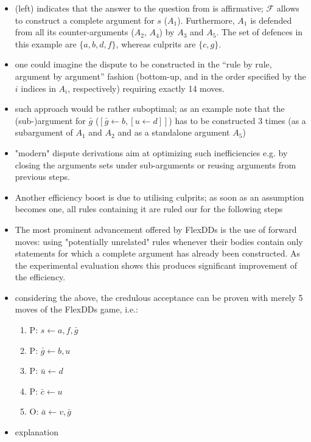 \documentclass[conference]{IEEEtran}
\newcommand{\frF}{\ensuremath{\mathcal{F}}\xspace}
\newcommand{\rulA}[2]{\ensuremath{#1 \leftarrow #2}\xspace}
\newcommand{\argu}[1]{\ensuremath{A_{#1}}}
\newcommand{\arguInline}[2]{\ensuremath{[\rulA{#1}{#2}]}}
\newcommand{\stmt}[1]{\ensuremath{#1}}
\begin{document}
\begin{itemize}
  \item {} (left) indicates that the answer to the question from  is affirmative; \frF allows to construct a complete argument for $s$ ($A_1$). Furthermore, $A_1$ is defended from all its counter-arguments ($A_2$, $A_4$) by $A_3$ and $A_5$. The set of defences in this example are $\{ a,b,d,f \}$, whereas culprits are $\{ c, g \}$. 
  \item one could imagine the dispute to be constructed in the ``rule by rule, argument by argument'' fashion (bottom-up, and in the order specified by the $i$ indices in $A_i$, respectively) requiring exactly 14 moves.
  \item such approach  would be rather suboptimal; as an example note that the (sub-)argument for \stmt{\bar{g}} (\arguInline{\bar{g}}{b, \arguInline{u}{d}}) has to be constructed 3 times (as a subargument of \argu{1} and \argu{2} and as a standalone argument \argu{5})
  \item "modern" dispute derivations aim at optimizing such inefficiencies e.g. by closing the arguments sets under sub-arguments or reusing arguments from previous steps.
  \item Another efficiency boost is due to utilising culprits; as soon as an assumption becomes one, all rules containing it are ruled our for the following steps
  \item The most prominent advancement offered by FlexDDs is the use of forward moves: using "potentially unrelated" rules whenever their bodies contain only statements for which a complete argument has already been constructed. As the experimental evaluation shows this produces significant improvement of the efficiency.  
  \item considering the above, the credulous acceptance can be proven with merely 5 moves of the FlexDDs game, i.e.:
  \begin{enumerate}
    \renewcommand{\labelenumi}{step \arabic{enumi}.}
    \item P: \rulA{s}{a,f,\bar{g}}
    \item P: \rulA{\bar{g}}{b,u}
    \item P: \rulA{\bar{u}}{d}
    \item P: \rulA{\bar{c}}{u}
    \item O: \rulA{\bar{a}}{v,\bar{g}}
  \end{enumerate}
  \item explanation

\end{itemize}
\end{document}
